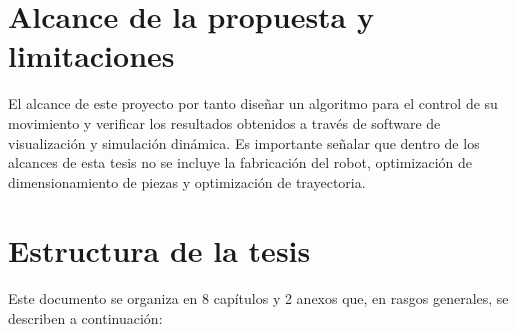 \newpage


\section{Alcance de la propuesta y limitaciones}

El alcance de este proyecto por tanto diseñar un algoritmo para el control de su movimiento y verificar los resultados obtenidos a través de software de visualización y simulación dinámica. Es importante señalar que dentro de los alcances de esta tesis no se incluye la fabricación del robot, optimización de dimensionamiento de piezas y  optimización de trayectoria.


\section{Estructura de la tesis}

Este documento se organiza en 8 capítulos y 2 anexos que, en rasgos generales, se describen a continuación:

